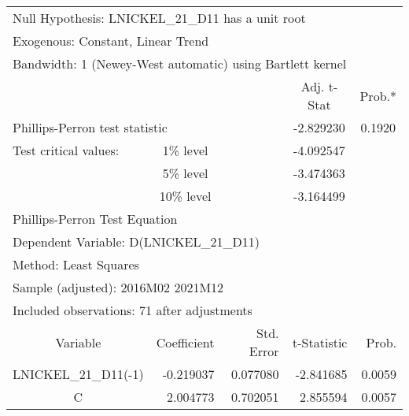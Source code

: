 \begin{tabular}{lrrrr}
\toprule
\multicolumn{4}{l}{Null Hypothesis: LNICKEL\_21\_D11 has a unit root}&\multicolumn{1}{c}{}\\
\multicolumn{3}{l}{Exogenous: Constant, Linear Trend}&\multicolumn{1}{c}{}&\multicolumn{1}{c}{}\\
\multicolumn{5}{l}{Bandwidth: 1 (Newey-West automatic) using Bartlett kernel}\\
\midrule
\multicolumn{1}{c}{}&\multicolumn{1}{c}{}&\multicolumn{1}{c}{}&\multicolumn{1}{c}{Adj. t-Stat}&\multicolumn{1}{c}{Prob.*}\\
\midrule
\multicolumn{2}{l}{Phillips-Perron test statistic}&\multicolumn{1}{l}{}&\multicolumn{1}{c}{-2.829230}&\multicolumn{1}{c}{0.1920}\\
\multicolumn{1}{l}{Test critical values:}&\multicolumn{1}{c}{1\% level}&\multicolumn{1}{c}{}&\multicolumn{1}{c}{-4.092547}&\multicolumn{1}{c}{}\\
\multicolumn{1}{c}{}&\multicolumn{1}{c}{5\% level}&\multicolumn{1}{c}{}&\multicolumn{1}{c}{-3.474363}&\multicolumn{1}{c}{}\\
\multicolumn{1}{c}{}&\multicolumn{1}{c}{10\% level}&\multicolumn{1}{c}{}&\multicolumn{1}{c}{-3.164499}&\multicolumn{1}{c}{}\\
\midrule
\multicolumn{2}{l}{Phillips-Perron Test Equation}&\multicolumn{1}{c}{}&\multicolumn{1}{c}{}&\multicolumn{1}{c}{}\\
\multicolumn{3}{l}{Dependent Variable: D(LNICKEL\_21\_D11)}&\multicolumn{1}{c}{}&\multicolumn{1}{c}{}\\
\multicolumn{2}{l}{Method: Least Squares}&\multicolumn{1}{c}{}&\multicolumn{1}{c}{}&\multicolumn{1}{c}{}\\
\multicolumn{3}{l}{Sample (adjusted): 2016M02 2021M12}&\multicolumn{1}{c}{}&\multicolumn{1}{c}{}\\
\multicolumn{4}{l}{Included observations: 71 after adjustments}&\multicolumn{1}{c}{}\\
\midrule
\multicolumn{1}{c}{Variable}&\multicolumn{1}{r}{Coefficient}&\multicolumn{1}{r}{Std. Error}&\multicolumn{1}{r}{t-Statistic}&\multicolumn{1}{r}{Prob.}\\
\midrule
\multicolumn{1}{c}{LNICKEL\_21\_D11(-1)}&\multicolumn{1}{r}{-0.219037}&\multicolumn{1}{r}{0.077080}&\multicolumn{1}{r}{-2.841685}&\multicolumn{1}{r}{0.0059}\\
\multicolumn{1}{c}{C}&\multicolumn{1}{r}{2.004773}&\multicolumn{1}{r}{0.702051}&\multicolumn{1}{r}{2.855594}&\multicolumn{1}{r}{0.0057}\\

\end{tabular}

